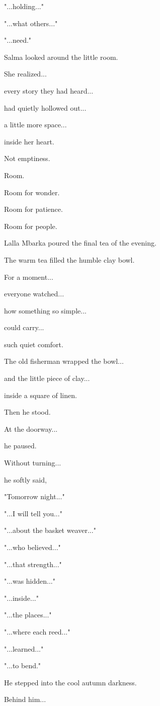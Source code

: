 \documentclass[12pt,openany]{book}
\begin{document}
"...holding..."

"...what others..."

"...need."

Salma looked around the little room.

She realized...

every story they had heard...

had quietly hollowed out...

a little more space...

inside her heart.

Not emptiness.

Room.

Room for wonder.

Room for patience.

Room for people.

Lalla Mbarka poured the final tea of the evening.

The warm tea filled the humble clay bowl.

For a moment...

everyone watched...

how something so simple...

could carry...

such quiet comfort.

The old fisherman wrapped the bowl...

and the little piece of clay...

inside a square of linen.

Then he stood.

At the doorway...

he paused.

Without turning...

he softly said,

"Tomorrow night..."

"...I will tell you..."

"...about the basket weaver..."

"...who believed..."

"...that strength..."

"...was hidden..."

"...inside..."

"...the places..."

"...where each reed..."

"...learned..."

"...to bend."

He stepped into the cool autumn darkness.

Behind him...
\end{document}
